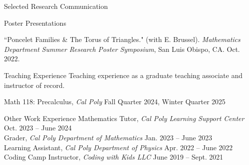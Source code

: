 \documentclass[
	11pt, %
]{cv} %
\begin{document}
\begin{rSection}{Selected Research Communication}
\begin{rSubsectionNumbered}{Poster Presentations}


		\item ``Poncelet Families \& The Torus of Triangles." (with E. Brussel). \textit{ Mathematics Department Summer Research Poster Symposium}, San Luis Obispo, CA. Oct. 2022.
	\end{rSubsectionNumbered}

	
\end{rSection}

\newpage
\begin{rSection}{Teaching Experience}
	Teaching experience as a graduate teaching associate and instructor of record.

	Math 118: Precalculus, \textit{Cal Poly} \dotfill Fall Quarter 2024, Winter Quarter 2025
\end{rSection}

\begin{rSection}{Other Work Experience}
	Mathematics Tutor, \textit{Cal Poly Learning Support Center} \dotfill Oct. 2023 -- June 2024 \\
	Grader, \textit{Cal Poly Department of Mathematics} \dotfill Jan. 2023 -- June 2023 \\
	Learning Assistant, \textit{Cal Poly Department of Physics} \dotfill Apr. 2022 -- June 2022 \\
	Coding Camp Instructor, \textit{Coding with Kids LLC} \dotfill June 2019 -- Sept. 2021
\end{rSection}
\end{document}
